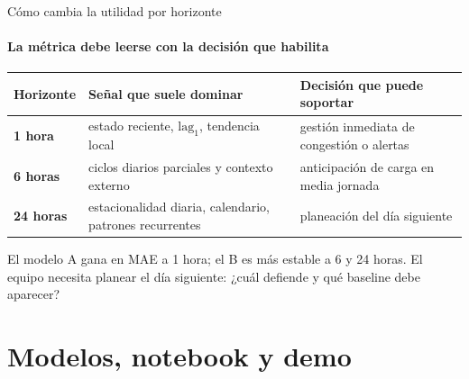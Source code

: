 \documentclass[aspectratio=169,11pt]{beamer}  %
\newcommand{\hrow}{\rowcolor{mlcream}}
\begin{document}
\begin{frame}{Cómo cambia la utilidad por horizonte}
\framesubtitle{La métrica debe leerse con la decisión que habilita}
\centering\small
\begin{tabular}{@{}l P{0.39\textwidth} P{0.40\textwidth}@{}}
\toprule
\hrow \textbf{Horizonte} & Señal que suele dominar & Decisión que puede soportar\\
\midrule
\textbf{1 hora} & estado reciente, $\mathrm{lag}_1$, tendencia local & gestión inmediata de congestión o alertas\\
\textbf{6 horas} & ciclos diarios parciales y contexto externo & anticipación de carga en media jornada\\
\textbf{24 horas} & estacionalidad diaria, calendario, patrones recurrentes & planeación del día siguiente\\
\bottomrule
\end{tabular}
\raggedright
\begin{taskbox}[Práctica]
\small El modelo A gana en MAE a 1 hora; el B es más estable a 6 y 24 horas. El equipo necesita planear el día siguiente: ¿cuál defiende y qué baseline debe aparecer?
\end{taskbox}
\end{frame}

\section{Modelos, notebook y demo}
\end{document}
